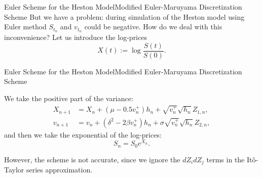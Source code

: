\begin{frame}{Euler Scheme for the Heston Model}{Modified Euler-Maruyama Discretization Scheme}
    But we have a problem: during simulation of the Heston model using Euler method $S_{t_n}$ and $v_{t_n}$ could be negative. How do we deal with this inconvenience?
    Let us introduce the log-prices
    \begin{equation}
        X(t) := \log\frac{S(t)}{S(0)}.
    \end{equation}
\end{frame}

\begin{frame}{Euler Scheme for the Heston Model}{Modified Euler-Maruyama Discretization Scheme}
    
    We take the positive part of the variance:
    \begin{align}
        X_{n+1} & = X_n + (\mu - 0.5 v_n^+)h_n + \sqrt{v_n^+} \sqrt{h_n} Z_{1,n}, \label{Euler:Heston:price:posmod}\\
        v_{n+1} & = v_n + \left(\delta^2 - 2\beta v_n^+\right) h_n + \sigma \sqrt{v_n^+} \sqrt{h_n} Z_{2,n}, \label{Euler:Heston:variance:posmod}
    \end{align}
    and then we take the exponential of the log-prices:
    \begin{equation}
        S_{n} = S_0 e^{X_{n}}.
    \end{equation}
    
    However, the scheme is not accurate, since we ignore the $dZ_idZ_j$ terms in the It\^o-Taylor series approximation.
\end{frame}
